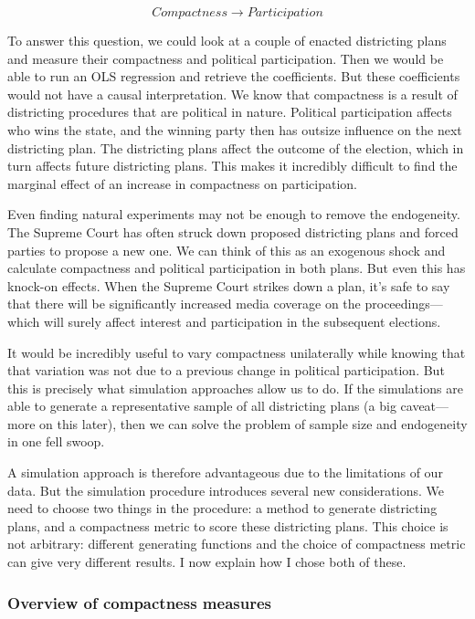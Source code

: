 \documentclass[]{article}
\begin{document}
\[Compactness \rightarrow Participation\]

To answer this question, we could look at a couple of enacted
districting plans and measure their compactness and political
participation. Then we would be able to run an OLS regression and
retrieve the coefficients. But these coefficients would not have a
causal interpretation. We know that compactness is a result of
districting procedures that are political in nature. Political
participation affects who wins the state, and the winning party then has
outsize influence on the next districting plan. The districting plans
affect the outcome of the election, which in turn affects future
districting plans. This makes it incredibly difficult to find the
marginal effect of an increase in compactness on participation.

Even finding natural experiments may not be enough to remove the
endogeneity. The Supreme Court has often struck down proposed
districting plans and forced parties to propose a new one. We can think
of this as an exogenous shock and calculate compactness and political
participation in both plans. But even this has knock-on effects. When
the Supreme Court strikes down a plan, it's safe to say that there will
be significantly increased media coverage on the proceedings---which
will surely affect interest and participation in the subsequent
elections.

It would be incredibly useful to vary compactness unilaterally while
knowing that that variation was not due to a previous change in
political participation. But this is precisely what simulation
approaches allow us to do. If the simulations are able to generate a
representative sample of all districting plans (a big caveat---more on
this later), then we can solve the problem of sample size and
endogeneity in one fell swoop.

A simulation approach is therefore advantageous due to the limitations
of our data. But the simulation procedure introduces several new
considerations. We need to choose two things in the procedure: a method
to generate districting plans, and a compactness metric to score these
districting plans. This choice is not arbitrary: different generating
functions and the choice of compactness metric can give very different
results. I now explain how I chose both of these.

\hypertarget{overview-of-compactness-measures}{%
\subsubsection{Overview of compactness
measures}\label{overview-of-compactness-measures}}
\end{document}
